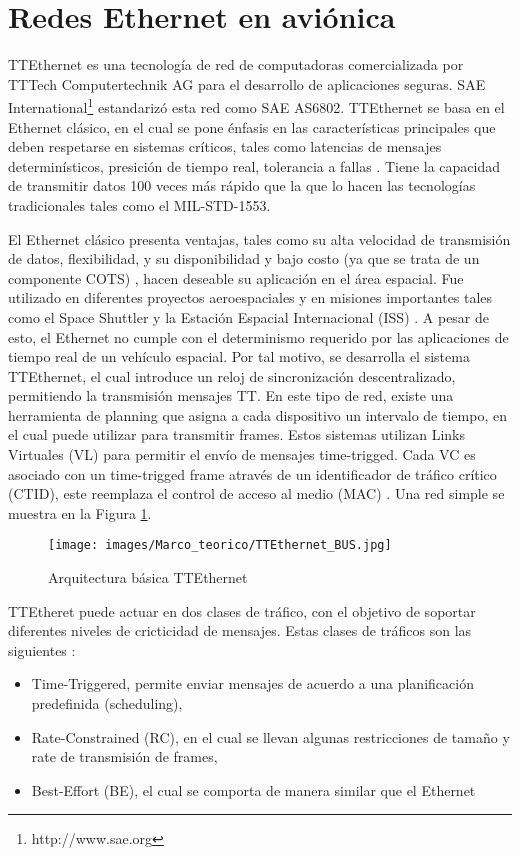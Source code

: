 \section{Redes Ethernet en aviónica}
TTEthernet es una tecnología de red de computadoras comercializada por TTTech Computertechnik AG para el desarrollo de aplicaciones seguras. SAE International\footnote{http://www.sae.org} estandarizó esta red como SAE AS6802. TTEthernet se basa en el Ethernet clásico, en el cual se pone énfasis en las características principales que deben respetarse en sistemas críticos, tales como latencias de mensajes determinísticos, presición de tiempo real, tolerancia a fallas \citep{Loveless15}. Tiene la capacidad de transmitir datos 100 veces más rápido que la que lo hacen las tecnologías tradicionales tales como el MIL-STD-1553.

El Ethernet clásico presenta ventajas, tales como su alta velocidad de transmisión de datos, flexibilidad, y su disponibilidad y bajo costo (ya que se trata de un componente COTS) \citep{Loveless15}, hacen deseable su aplicación en el área espacial. Fue utilizado en diferentes proyectos aeroespaciales y en misiones importantes tales como el Space Shuttler y la Estación Espacial Internacional (ISS) \citep{Loveless15}. A pesar de esto, el Ethernet no cumple con el determinismo requerido por las aplicaciones de tiempo real de un vehículo espacial. Por tal motivo, se desarrolla el sistema TTEthernet, el cual introduce un reloj de sincronización descentralizado, permitiendo la transmisión mensajes \ac{TT}. En este tipo de red, existe una herramienta de planning que asigna a cada dispositivo un intervalo de tiempo, en el cual puede utilizar para transmitir frames. Estos sistemas utilizan Links Virtuales (VL) para permitir el envío de mensajes time-trigged. Cada VC es asociado con un time-trigged frame através de un identificador de tráfico crítico (CTID), este reemplaza el control de acceso al medio (MAC) \citep{Loveless15}. Una red simple se muestra en la Figura \ref{fig:Arq_TTEthernet}.

\begin{figure}[h]
 \centering
 \texttt{[image: images/Marco\_teorico/TTEthernet\_BUS.jpg]}
  \caption{Arquitectura básica TTEthernet}
\label{fig:Arq_TTEthernet}
\end{figure}

TTEtheret puede actuar en dos clases de tráfico, con el objetivo de soportar diferentes niveles de cricticidad de mensajes. Estas clases de tráficos son las siguientes \citep{Loveless15} \citep{Steiner13}:
\begin{itemize}
	\item Time-Triggered, permite enviar mensajes de acuerdo a una planificación predefinida (scheduling),
	\item Rate-Constrained (RC), en el cual se llevan algunas restricciones de tamaño y rate de transmisión de frames,
	\item Best-Effort (BE), el cual se comporta de manera similar que el Ethernet
\end{itemize}

